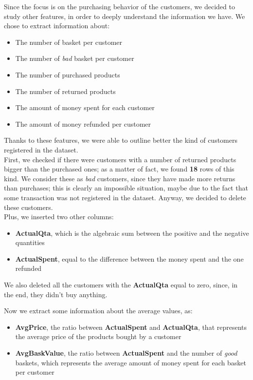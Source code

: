 Since the focus is on the purchasing behavior of the customers, we decided to study other features, in order to deeply understand the information we have. We chose to extract information about:
\begin{itemize}
\item The number of basket per customer
\item The number of \emph{bad} basket per customer
\item The number of purchased products
\item The number of returned products
\item The amount of money spent for each customer
\item The amount of money refunded per customer
\end{itemize}

Thanks to these features, we were able to outline better the kind of customers registered in the dataset.\\
First, we checked if there were customers with a number of returned products bigger than the purchased ones; as a matter of fact, we found \textbf{18} rows of this kind. We consider these as \emph{bad} customers, since they have made more returns than purchases; this is clearly an impossible situation, maybe due to the fact that some transaction was not registered in the dataset.
Anyway, we decided to delete these customers.\\
Plus, we inserted two other columns:
\begin{itemize}
\item \textbf{ActualQta}, which is the algebraic sum between the positive and the negative quantities
\item \textbf{ActualSpent}, equal to the difference between the money spent and the one refunded
\end{itemize}

We also deleted all the customers with the \textbf{ActualQta} equal to zero, since, in the end, they didn't buy anything. 

Now we extract some information about the average values, as:
\begin{itemize}
\item \textbf{AvgPrice}, the ratio between \textbf{ActualSpent} and \textbf{ActualQta}, that represents the average price of the products bought by a customer
\item \textbf{AvgBaskValue}, the ratio between \textbf{ActualSpent} and the number of \emph{good} baskets, which represents the average amount of money spent for each basket per customer
\end{itemize}

